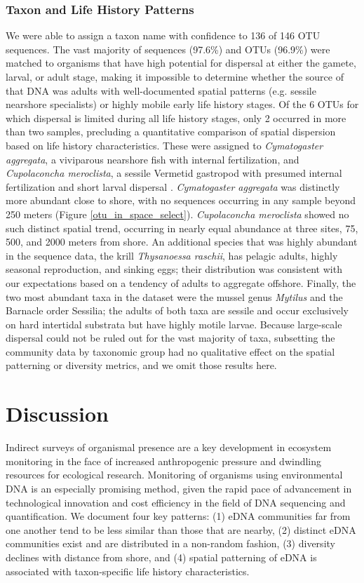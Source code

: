 \documentclass[11pt,letterpaper]{article} %
\begin{document}
\subsubsection*{Taxon and Life History Patterns}
We were able to assign a taxon name with confidence to 136 of 146 OTU sequences. The vast majority of sequences (97.6\%) and OTUs (96.9\%) were matched to organisms that have high potential for dispersal at either the gamete, larval, or adult stage, making it impossible to determine whether the source of that DNA was adults with well-documented spatial patterns (e.g. sessile nearshore specialists) or highly mobile early life history stages. Of the 6 OTUs for which dispersal is limited during all life history stages, only 2 occurred in more than two samples, precluding a quantitative comparison of spatial dispersion based on life history characteristics. These were assigned to \textit{Cymatogaster aggregata}, a viviparous nearshore fish with internal fertilization, and \textit{Cupolaconcha meroclista}, a sessile Vermetid gastropod with presumed internal fertilization and short larval dispersal \citep{Strathmann2006, Phillips2010, Calvo2004}. \textit{Cymatogaster aggregata} was distinctly more abundant close to shore, with no sequences occurring in any sample beyond 250 meters (Figure \ref{otu_in_space_select}). \textit{Cupolaconcha meroclista} showed no such distinct spatial trend, occurring in nearly equal abundance at three sites, 75, 500, and 2000 meters from shore.
An additional species that was highly abundant in the sequence data, the krill \textit{Thysanoessa raschii}, has pelagic adults, highly seasonal reproduction, and sinking eggs; their distribution was consistent with our expectations based on a tendency of adults to aggregate offshore.
Finally, the two most abundant taxa in the dataset were the mussel genus \textit{Mytilus} and the Barnacle order Sessilia; the adults of both taxa are sessile and occur exclusively on hard intertidal substrata but have highly motile larvae.
Because large-scale dispersal could not be ruled out for the vast majority of taxa, subsetting the community data by taxonomic group had no qualitative effect on the spatial patterning or diversity metrics, and we omit those results here.


\section*{Discussion}
Indirect surveys of organismal presence are a key development in ecosystem monitoring in the face of increased anthropogenic pressure and dwindling resources for ecological research. Monitoring of organisms using environmental DNA is an especially promising method, given the rapid pace of advancement in technological innovation and cost efficiency in the field of DNA sequencing and quantification. We document four key patterns: (1) eDNA communities far from one another tend to be less similar than those that are nearby, (2) distinct eDNA communities exist and are distributed in a non-random fashion, (3) diversity declines with distance from shore, and (4) spatial patterning of eDNA is associated with taxon-specific life history characteristics.
\end{document}
